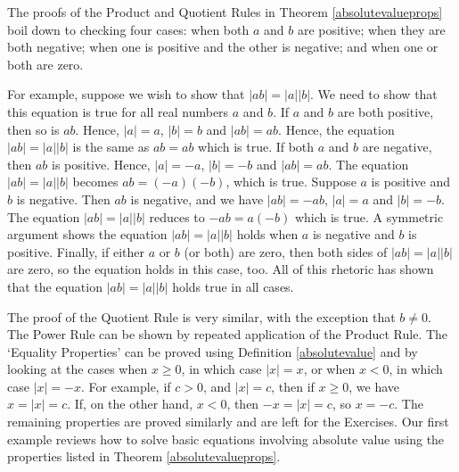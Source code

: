 \medskip

The proofs of the Product and Quotient Rules in Theorem \ref{absolutevalueprops} boil down to checking four cases:  when both $a$ and $b$ are positive;  when they are both negative;  when one is positive and the other is negative; and when one or both are zero.  

\medskip

For example, suppose we wish to show that $|ab| = |a||b|$.  We need to show that this equation is true for all real numbers $a$ and $b$.  If $a$ and $b$ are both positive, then so is $ab$.  Hence, $|a| = a$, $|b| = b$ and $|ab| = ab$.  Hence, the equation $|ab| = |a||b|$ is the same as $ab = ab$ which is true.  If both $a$ and $b$ are negative, then $ab$ is positive.  Hence, $|a| = -a$, $|b| = -b$ and $|ab| = ab$.  The equation $|ab| = |a||b|$ becomes $ab = (-a)(-b)$, which is true.  Suppose $a$ is positive and $b$ is negative. Then $ab$ is negative, and we have $|ab| = -ab$, $|a| = a$ and $|b| = -b$.  The equation $|ab| = |a||b|$ reduces to $-ab = a(-b)$ which is true.  A symmetric argument shows the equation $|ab| = |a||b|$ holds when $a$ is negative and $b$ is positive.  Finally, if either $a$ or $b$ (or both) are zero, then both sides of $|ab| = |a||b|$ are zero, so the equation holds in this case, too.  All of this rhetoric has shown that the equation $|ab| = |a||b|$ holds true in all cases.  

\medskip

The proof of the Quotient Rule is very similar, with the exception that $b \neq 0$. The Power Rule can be shown by repeated application of the Product Rule.  The `Equality Properties' can be proved using Definition \ref{absolutevalue} and by looking at the cases when $x\geq 0$, in which case $|x| = x$, or when $x<0$, in which case $|x| = -x$.  For example, if $c>0$, and $|x| = c$, then if $x \geq 0$, we have $x = |x| = c$.  If, on the other hand, $x < 0$, then $-x = |x| = c$, so $x = -c$.  The remaining properties are proved similarly and are left for the Exercises.  Our first example reviews how to solve basic equations involving absolute value using the properties listed in Theorem \ref{absolutevalueprops}.


